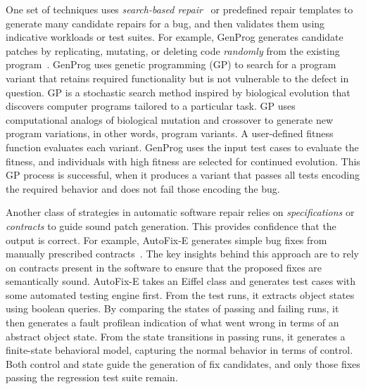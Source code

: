 One set of techniques uses {\em search-based repair}~\cite{harman07} or predefined repair templates to generate many candidate repairs for a bug, and then validates them using indicative workloads or test suites. For example, GenProg generates candidate patches by replicating, mutating, or deleting code \emph{randomly} from the existing program~\cite{genprog-icse2012, Weimer2009:AFP}. GenProg uses genetic programming (GP) to search for a program variant that retains required functionality but is not vulnerable to the defect in question. GP is a stochastic search method inspired by biological evolution that discovers computer programs tailored to a particular task. GP uses computational analogs of biological mutation and crossover to generate new program variations, in other words, program variants. A user-defined fitness function evaluates each variant. GenProg uses the input test cases to evaluate the fitness, and individuals with high fitness are selected for continued evolution. This GP process is successful, when it produces a variant that passes all tests encoding the required behavior and does not fail those encoding the bug.


Another class of strategies in automatic software repair relies on {\em specifications} or {\em contracts} to guide sound patch generation. %
This provides confidence that the output is correct. For example, AutoFix-E generates simple bug fixes from manually prescribed contracts~\cite{Wei:2010:AutoFix-E}. The key insights behind this approach are to rely on contracts present in the software to ensure that the proposed fixes are semantically sound. AutoFix-E takes an Eiffel class and generates test cases with some automated testing engine first. From the test runs, it extracts object states using boolean queries. By comparing the states of passing and failing runs, it then generates a fault profile\textemdash an indication of what went wrong in terms of an abstract object state. From the state transitions in passing runs, it generates a finite-state behavioral model, capturing the normal behavior in terms of control. Both control and state guide the generation of fix candidates, and only those fixes passing the regression test suite remain. 


